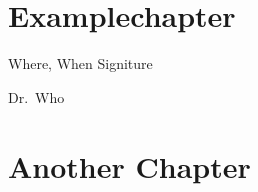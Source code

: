 \chapter*{Examplechapter}
\blindtext
\vspace{4cm}
\hspace{2cm} Where, When \hfill Signiture \hspace{2cm}

\newpage
\vfill
\begin{quotation}
\emph{\blindtext}
\end{quotation}
\begin{flushright}
    Dr.\ Who
\end{flushright}
\newpage

\chapter{Another Chapter}
\blindtext
\newpage


